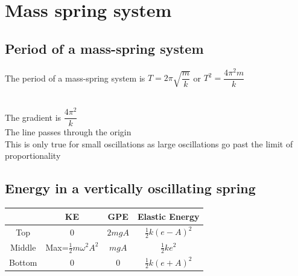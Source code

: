 \documentclass{article}[18pt]
\begin{document}
\section{Mass spring system}
\subsection{Period of a mass-spring system}
The period of a mass-spring system is $T=2\pi\sqrt{\dfrac{m}{k}}$ or $T^2=\dfrac{4\pi^2m}{k}$\\
\\
The gradient is $\dfrac{4\pi^2}{k}$\\
The line passes through the origin\\
This is only true for small oscillations as large oscillations go past the limit of proportionality
\subsection{Energy in a vertically oscillating spring}
\begin{tabular}{|c|c|c|c|}
\hline
&KE&GPE&Elastic Energy\\
\hline
Top&0&$2mgA$&$\frac{1}{2}k(e-A)^2$\\
\hline
Middle&Max=$\frac{1}{2}m\omega^2A^2$&$mgA$&$\frac{1}{2}ke^2$\\
\hline
Bottom&0&0&$\frac{1}{2}k(e+A)^2$\\
\hline
\end{tabular}
\end{document}
